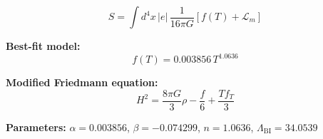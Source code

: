
\begin{equation}
  S = \int d^4x \, |e| \, \frac{1}{16\pi G} \left[ f(T) + \mathcal{L}_m \right]
\end{equation}

\textbf{Best-fit model:}
\begin{equation}
  f(T) = 0.003856 \, T^{1.0636}
\end{equation}

\textbf{Modified Friedmann equation:}
\begin{equation}
  H^2 = \frac{8\pi G}{3} \rho - \frac{f}{6} + \frac{T f_T}{3}
\end{equation}

\textbf{Parameters:}
$\alpha = 0.003856$, \quad
$\beta = -0.074299$, \quad
$n = 1.0636$, \quad
$\Lambda_{\text{BI}} = 34.0539$